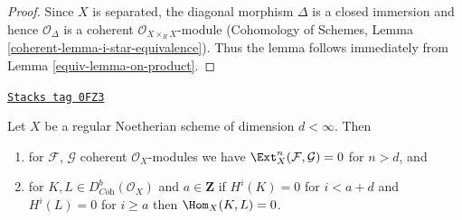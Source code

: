 \begin{proof}

Since $X$ is separated, the diagonal morphism $\Delta$ is a closed
immersion and hence $\mathcal{O}_\Delta$ is a coherent
$\mathcal{O}_{X \times_R X}$-module (Cohomology of Schemes, Lemma
\ref{coherent-lemma-i-star-equivalence}).
Thus the lemma follows immediately from Lemma \ref{equiv-lemma-on-product}.
\end{proof}

\begin{lemma}
\label{equiv-lemma-Ext-0-regular}
\href{https://stacks.math.columbia.edu/tag/0FZ3}{\texttt{Stacks tag 0FZ3}}

Let $X$ be a regular Noetherian scheme of dimension $d < \infty$. Then
\begin{enumerate}
\item for $\mathcal{F}$, $\mathcal{G}$ coherent $\mathcal{O}_X$-modules
we have $\Ext^n_X(\mathcal{F}, \mathcal{G}) = 0$ for $n > d$, and
\item for $K, L \in D^b_{\textit{Coh}}(\mathcal{O}_X)$ and $a \in \mathbf{Z}$
if $H^i(K) = 0$ for $i < a + d$ and $H^i(L) = 0$ for $i \geq a$ then
$\Hom_X(K, L) = 0$.
\end{enumerate}
\end{lemma}


